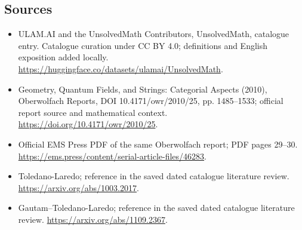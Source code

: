 \documentclass[11pt]{article}
\begin{document}
\subsection{Sources}
\begin{itemize}
\item[\hypertarget{source:statement:1}{S1}] ULAM.AI and the UnsolvedMath Contributors, UnsolvedMath, catalogue entry. Catalogue curation under CC BY 4.0; definitions and English exposition added locally.
\url{https://huggingface.co/datasets/ulamai/UnsolvedMath}.
\item[\hypertarget{source:statement:2}{S2}] Geometry, Quantum Fields, and Strings: Categorial Aspects (2010), Oberwolfach Reports, DOI 10.4171/owr/2010/25, pp. 1485--1533; official report source and mathematical context.
\url{https://doi.org/10.4171/owr/2010/25}.
\item[\hypertarget{source:statement:3}{S3}] Official EMS Press PDF of the same Oberwolfach report; PDF pages 29--30.
\url{https://ems.press/content/serial-article-files/46283}.
\item[\hypertarget{source:statement:4}{S4}] Toledano-Laredo; reference in the saved dated catalogue literature review.
\url{https://arxiv.org/abs/1003.2017}.
\item[\hypertarget{source:statement:5}{S5}] Gautam--Toledano-Laredo; reference in the saved dated catalogue literature review.
\url{https://arxiv.org/abs/1109.2367}.
\end{itemize}
\label{end:statement}
\end{document}

